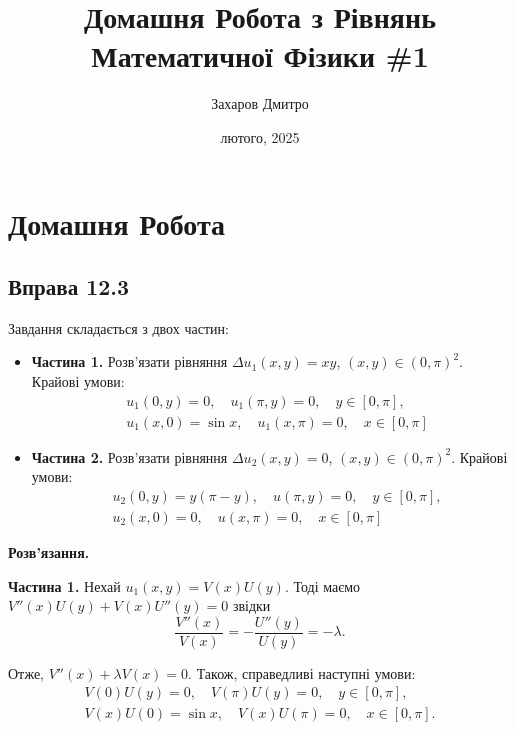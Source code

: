 \documentclass{hw_template}
\title{\huge\sffamily\bfseries Домашня Робота з Рівнянь Математичної Фізики \#1}
\author{\Large\sffamily Захаров Дмитро}
\date{\sffamily 27 лютого, 2025}
\begin{document}
\pagestyle{fancy}

\maketitle

\tableofcontents

\pagebreak

\section{Домашня Робота}

\subsection{Вправа 12.3}

\begin{problem}
    Завдання складається з двох частин:
    \begin{itemize}
        \item \textbf{Частина 1.} Розв'язати рівняння $\Delta u_1(x,y) = xy$,
            $(x,y) \in (0,\pi)^2$. Крайові умови: 
            \begin{align*} 
                &u_1(0,y) = 0, \quad u_1(\pi,y) = 0, \quad y \in [0,\pi], \\
                &u_1(x,0) = \sin x, \quad u_1(x,\pi) = 0, \quad x \in [0,\pi]
        \end{align*}
        \item \textbf{Частина 2.} Розв'язати рівняння $\Delta u_2(x,y) = 0$,
        $(x,y) \in (0,\pi)^2$. Крайові умови: 
        \begin{align*} 
            &u_2(0,y) = y(\pi-y), \quad u(\pi,y) = 0, \quad y \in [0,\pi], \\
            &u_2(x,0) = 0, \quad u(x,\pi) = 0, \quad x \in [0,\pi]
        \end{align*}
    \end{itemize}
\end{problem}

\textbf{Розв'язання.} 

\textbf{Частина 1.} Нехай $u_1(x,y) = V(x)U(y)$. Тоді маємо $V''(x)U(y) + V(x)U''(y) = 0$ звідки
\begin{equation*}
    \frac{V''(x)}{V(x)} = -\frac{U''(y)}{U(y)} = -\lambda.
\end{equation*}

Отже, $V''(x) + \lambda V(x) = 0$. Також, справедливі наступні умови:
\begin{align*}
    V(0)U(y) = 0, \quad V(\pi)U(y) = 0, \quad y \in [0,\pi], \\
    V(x)U(0) = \sin x, \quad V(x)U(\pi) = 0, \quad x \in [0,\pi].
\end{align*}
\end{document}
